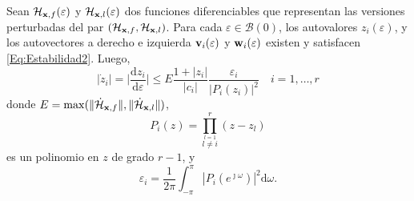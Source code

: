 		\begin{Corollary}\label{Co:Estabilidad}
			Sean $\mathcal{H}_{\mathbf{x},f}(\varepsilon)$ y $\mathcal{H}_{\mathbf{x},l}(\varepsilon)$ dos funciones diferenciables que representan las versiones perturbadas del par $(\mathcal{H}_{\mathbf{x},f},\mathcal{H}_{\mathbf{x},l})$. Para cada $\varepsilon\in\mathcal{B}(0)$, los autovalores $z_i(\varepsilon)$, y los autovectores a derecho e izquierda $\mathbf{v}_i(\varepsilon)$ y $\mathbf{w}_i(\varepsilon)$ existen y satisfacen \eqref{Eq:Estabilidad2}. Luego,
			\begin{equation}
				|\dot{z}_i| = \bigg|\frac{\mathrm{d}z_i}{\mathrm{d}\varepsilon}\bigg|\le E \frac{1+|z_i|}{|c_i|}\frac{\varepsilon_i}{|P_i(z_i)|^2}\quad i = 1,\ldots,r
				\label{Eq:CorollaryEstabilidad1}
			\end{equation} 
			donde $E = \max(\|\dot{\mathcal{H}}_{\mathbf{x},f}\|, \|\dot{\mathcal{H}}_{\mathbf{x},l}\|)$, 
			\[ P_i(z) = \prod_{\stackrel{l=1}{l\neq i}}^{r}(z-z_l)\]
			es un polinomio en $z$ de grado $r-1$, y
			\[\varepsilon_i= \frac{1}{2\pi}\int_{-\pi}^{\pi}|P_i(e^{\jmath\omega})|^2\mathrm{d}\omega.\]
		\end{Corollary}
